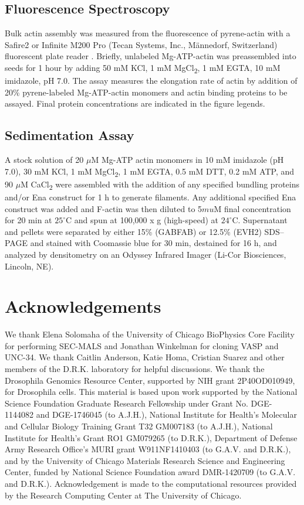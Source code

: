 \subsection{Fluorescence Spectroscopy}\label{ena-mm-pyrene}

Bulk actin assembly was measured from the fluorescence of pyrene-actin with a Safire2 or Infinite M200 Pro (Tecan Systems, Inc., M\"annedorf, Switzerland) fluorescent plate reader \citep{neidt_cytokinesis_2008,zimmermann_vitro_2016}. Briefly, unlabeled Mg-ATP-actin was preassembled into seeds for 1 hour by adding 50 mM KCl, 1 mM MgCl\textsubscript{2}, 1 mM EGTA, 10 mM imidazole, pH 7.0. The assay measures the elongation rate of actin by addition of 20\% pyrene-labeled Mg-ATP-actin monomers and actin binding proteins to be assayed. Final protein concentrations are indicated in the figure legends.

\subsection{Sedimentation Assay}\label{ena-mm-sedimentation}
A stock solution of 20 $\mu$M Mg-ATP actin monomers in 10 mM imidazole (pH 7.0), 30 mM KCl, 1 mM MgCl\textsubscript{2}, 1 mM EGTA, 0.5 mM DTT, 0.2 mM ATP, and 90 $\mu$M CaCl\textsubscript{2} were assembled with the addition of any specified bundling proteins and/or Ena construct for 1 h to generate filaments. Any additional specified Ena construct was added and F-actin was then diluted to 5$mu$M final concentration for 20 min at $25^{\circ}$C and spun at 100,000 x g (high-speed) at $24^{\circ}$C. Supernatant and pellets were separated by either 15\% (GABFAB) or 12.5\% (EVH2) SDS–PAGE and stained with Coomassie blue for 30 min, destained for 16 h, and analyzed by densitometry on an Odyssey Infrared Imager (Li-Cor Biosciences, Lincoln, NE).

\section{Acknowledgements}\label{ch02-acknowledgements}

We thank Elena Solomaha of the University of Chicago BioPhysics Core Facility for performing SEC-MALS and Jonathan Winkelman for cloning VASP and UNC-34. We thank Caitlin Anderson, Katie Homa, Cristian Suarez and other members of the D.R.K. laboratory for helpful discussions. We thank the Drosophila Genomics Resource Center, supported by NIH grant 2P40OD010949, for Drosophila cells. This material is based upon work supported by the National Science Foundation Graduate Research Fellowship under Grant No. DGE-1144082 and DGE-1746045 (to A.J.H.), National Institute for Health's Molecular and Cellular Biology Training Grant T32 GM007183 (to A.J.H.), National Institute for Health's Grant RO1 GM079265 (to D.R.K.), Department of Defense Army Research Office's MURI grant W911NF1410403 (to G.A.V. and D.R.K.), and by the University of Chicago Materials Research Science and Engineering Center, funded by National Science Foundation award DMR-1420709 (to G.A.V. and D.R.K.). Acknowledgement is made to the computational resources provided by the Research Computing Center at The University of Chicago.

